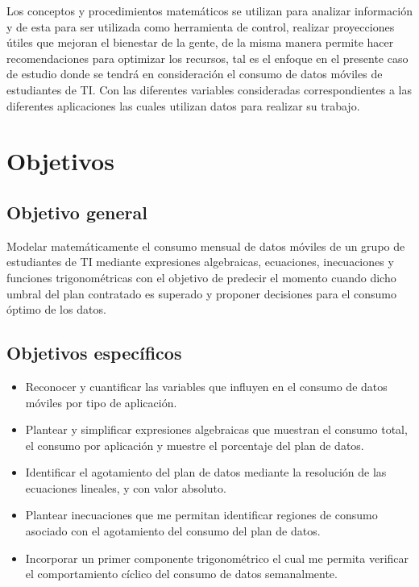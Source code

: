 \documentclass[12pt,a4paper]{article}
\begin{document}
	Los conceptos y procedimientos matemáticos se utilizan para analizar información y de esta para ser utilizada como herramienta de control, realizar proyecciones útiles que mejoran el bienestar de la gente, de la misma manera permite hacer recomendaciones para optimizar los recursos, tal es el enfoque en el presente caso de estudio donde se tendrá en consideración el consumo de datos móviles de estudiantes de TI. Con las diferentes variables consideradas correspondientes a las diferentes aplicaciones las cuales utilizan datos para realizar su trabajo.
	
	\section{Objetivos}
	
	\subsection{Objetivo general}
	
	Modelar matemáticamente el consumo mensual de datos móviles de un grupo de estudiantes de TI mediante expresiones algebraicas, ecuaciones, inecuaciones y funciones trigonométricas con el objetivo de predecir el momento cuando dicho  umbral del plan contratado es superado y proponer decisiones para el consumo óptimo de los datos.
	
	\subsection{Objetivos específicos}
	
	\begin{itemize}
		\item Reconocer y cuantificar las variables que influyen en el consumo de datos móviles por tipo de aplicación.
		\item Plantear y simplificar expresiones algebraicas que muestran el consumo total, el consumo por aplicación y muestre el porcentaje del plan de datos.
		\item Identificar el agotamiento del plan de datos mediante la resolución de las ecuaciones lineales, y con valor absoluto.
		\item Plantear inecuaciones que me permitan identificar regiones de consumo asociado con el agotamiento del consumo del plan de datos.
		\item Incorporar un primer componente trigonométrico el cual me permita verificar el comportamiento cíclico del consumo de datos semanalmente.
		
	\end{itemize}
	
\end{document}
